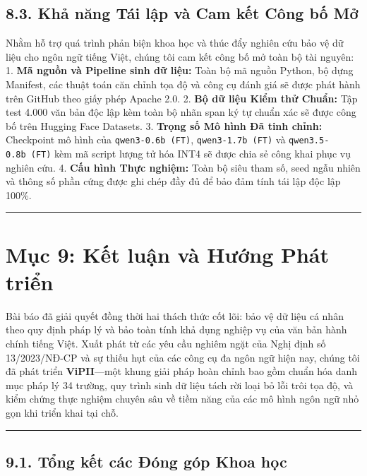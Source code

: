 \documentclass[
  11pt,
  a4paper,
]{article}
\begin{document}
\subsection{8.3. Khả năng Tái lập và Cam kết Công bố
Mở}\label{khux1ea3-nux103ng-tuxe1i-lux1eadp-vuxe0-cam-kux1ebft-cuxf4ng-bux1ed1-mux1edf}

Nhằm hỗ trợ quá trình phản biện khoa học và thúc đẩy nghiên cứu bảo vệ dữ liệu cho ngôn ngữ tiếng
Việt, chúng tôi cam kết công bố mở toàn bộ tài nguyên: 1. \textbf{Mã nguồn và Pipeline sinh dữ
liệu:} Toàn bộ mã nguồn Python, bộ dựng Manifest, các thuật toán căn chỉnh tọa độ và công cụ đánh
giá sẽ được phát hành trên GitHub theo giấy phép Apache 2.0. 2. \textbf{Bộ dữ liệu Kiểm thử Chuẩn:}
Tập test 4.000 văn bản độc lập kèm toàn bộ nhãn span ký tự chuẩn xác sẽ được công bố trên Hugging
Face Datasets. 3. \textbf{Trọng số Mô hình Đã tinh chỉnh:} Checkpoint mô hình của
\texttt{qwen3-0.6b\ (FT)}, \texttt{qwen3-1.7b\ (FT)} và \texttt{qwen3.5-0.8b\ (FT)} kèm mã script
lượng tử hóa INT4 sẽ được chia sẻ công khai phục vụ nghiên cứu. 4. \textbf{Cấu hình Thực nghiệm:}
Toàn bộ siêu tham số, seed ngẫu nhiên và thông số phần cứng được ghi chép đầy đủ để bảo đảm tính tái
lập độc lập 100\%.

\begin{center}\rule{0.5\linewidth}{0.5pt}\end{center}

\section{Mục 9: Kết luận và Hướng Phát
triển}\label{mux1ee5c-9-kux1ebft-luux1eadn-vuxe0-hux1b0ux1edbng-phuxe1t-triux1ec3n}

Bài báo đã giải quyết đồng thời hai thách thức cốt lõi: bảo vệ dữ liệu cá nhân theo quy định pháp lý
và bảo toàn tính khả dụng nghiệp vụ của văn bản hành chính tiếng Việt. Xuất phát từ các yêu cầu
nghiêm ngặt của Nghị định số 13/2023/NĐ-CP và sự thiếu hụt của các công cụ đa ngôn ngữ hiện nay,
chúng tôi đã phát triển \textbf{ViPII}---một khung giải pháp hoàn chỉnh bao gồm chuẩn hóa danh mục
pháp lý 34 trường, quy trình sinh dữ liệu tách rời loại bỏ lỗi trôi tọa độ, và kiểm chứng thực
nghiệm chuyên sâu về tiềm năng của các mô hình ngôn ngữ nhỏ gọn khi triển khai tại chỗ.

\begin{center}\rule{0.5\linewidth}{0.5pt}\end{center}

\subsection{9.1. Tổng kết các Đóng góp Khoa
học}\label{tux1ed5ng-kux1ebft-cuxe1c-ux111uxf3ng-guxf3p-khoa-hux1ecdc}
\end{document}
